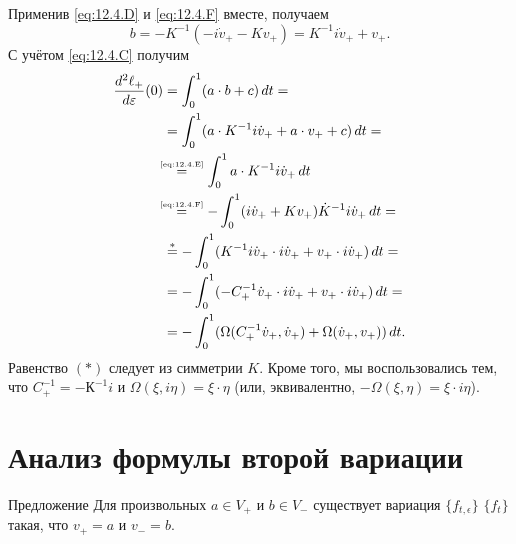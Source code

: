 Применив \ref{eq:12.4.D} и \ref{eq:12.4.F} вместе, получаем
\[b=-K^{-1}(-i\dot v_+ - K v_+) = K^{-1}i\dot v_+ + v_+.\]
С учётом \ref{eq:12.4.C} получим
\begin{align*}
\frac{d^2\ell_+}{d\varepsilon}(0)
&=
\int_0^1(a\cdot b+c)\,d t=
\\
&=\int_0^1(a\cdot K^{-1}i\dot v_++a\cdot v_++c)\,d t=
\\
&\!\!\!\stackrel{\text{\tiny \ref{eq:12.4.E}}}{=}\int_0^1 a\cdot K^{-1}i\dot v_+\,d t
\\
&\!\!\!\stackrel{\text{\tiny \ref{eq:12.4.F}}}{=}-\int_0^1(i\dot v_++Kv_+)\dot K^{-1}i\dot v_+\,d t=
\\
&\stackrel{{*}}{=}-\int_0^1(K^{-1}i\dot v_+\cdot i\dot v_+ +v_+\cdot i\dot v_+)\,d t=
\\
&=-\int_0^1(-C_+^{-1}\dot v_+\cdot i\dot v_++v_+\cdot i\dot v_+)\,d t=
\\
&=-\int_0^1(\Omega(C_+^{-1}\dot v_+,\dot v_+)+\Omega(\dot v_+,v_+))\,d t.
\end{align*}
Равенство $({*})$ следует из симметрии $K$.
Кроме того, мы воспользовались тем, что $C_+^{-1} = -К^{-1} i$ и $\Omega(\xi, i\eta) = \xi\cdot \eta$
(или, эквивалентно, $-\Omega(\xi, \eta) = \xi\cdot i\eta$).

\section{Анализ формулы второй вариации}

\begin{thm}{Предложение}\label{12.5.A}
Для произвольных $a \in V_+$ и $b \in V_-$ существует вариация $\{f_{t,\epsilon}\}$  $\{f_t\}$ такая, что $v_+ = a$ и $v_- = b$.
\end{thm}

